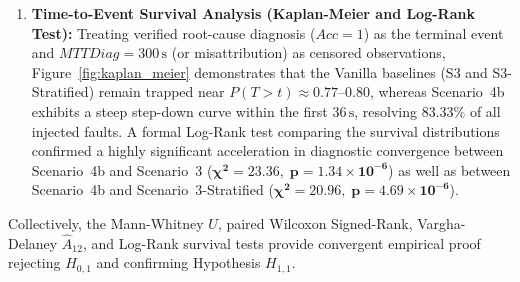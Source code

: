 \begin{enumerate}
    \item \textbf{Time-to-Event Survival Analysis (Kaplan-Meier and Log-Rank Test):} Treating verified root-cause diagnosis ($Acc = 1$) as the terminal event and $MTTDiag = 300\,\text{s}$ (or misattribution) as censored observations, Figure~\ref{fig:kaplan_meier} demonstrates that the Vanilla baselines (S3 and S3-Stratified) remain trapped near $P(T > t) \approx 0.77\text{--}0.80$, whereas Scenario~4b exhibits a steep step-down curve within the first $36\,\text{s}$, resolving $83.33\%$ of all injected faults. A formal Log-Rank test comparing the survival distributions confirmed a highly significant acceleration in diagnostic convergence between Scenario~4b and Scenario~3 ($\mathbf{\chi^2 = 23.36, \; p = 1.34 \times 10^{-6}}$) as well as between Scenario~4b and Scenario~3-Stratified ($\mathbf{\chi^2 = 20.96, \; p = 4.69 \times 10^{-6}}$).
\end{enumerate}

Collectively, the Mann-Whitney $U$, paired Wilcoxon Signed-Rank, Vargha-Delaney $\hat{A}_{12}$, and Log-Rank survival tests provide convergent empirical proof rejecting $H_{0,1}$ and confirming Hypothesis $H_{1,1}$.
